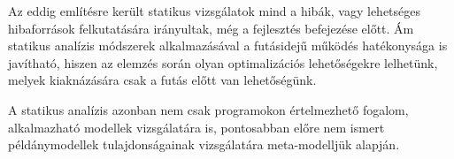 Az eddig említésre került statikus vizsgálatok mind a hibák, vagy lehetséges hibaforrások felkutatására irányultak, még a fejlesztés befejezése előtt. Ám statikus analízis módszerek alkalmazásával a futásidejű működés hatékonysága is javítható, hiszen az elemzés során olyan optimalizációs lehetőségekre lelhetünk, melyek kiaknázására csak a futás előtt van lehetőségünk.

A statikus analízis azonban nem csak programokon értelmezhető fogalom, alkalmazható modellek vizsgálatára is, pontosabban előre nem ismert példánymodellek tulajdonságainak vizsgálatára meta-modelljük alapján. 
